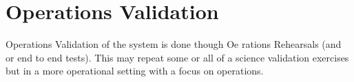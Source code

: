 
\section{Operations Validation}
 Operations Validation of the system is done though Oe rations Rehearsals (and or end to end tests).
 This may repeat some or all of a science validation exercises but in a more operational setting with a focus on operations.

